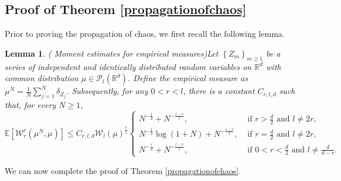 \documentclass[12pt]{article}
\numberwithin{equation}{section}
\newtheorem{lemma}[assumption]{Lemma}
\begin{document}
\subsection{Proof of Theorem \ref{propagationofchaos}}
 Prior to proving the propagation of chaos, we first recall the following lemma.
\begin{lemma}(\cite[Theorem 1]{Fournier2015empirical}  Moment estimates for empirical measures)\label{lem:Momentestimatesformeasure}
Let $\left\{Z_m\right\}_{m \geq 1}$ be a series of independent and identically distributed random variables on $\mathbb{R}^d$ with common distribution $\mu \in \mathcal{P}_{l}\left(\mathbb{R}^d\right)$. Define the empirical measure as $\mu^N=\tfrac{1}{N} \sum_{j=1}^N \delta_{Z_j}$. Subsequently, for any $0<r<l$, there is a constant $C_{r, l, d}$ such that, for every $N \geq 1$,
\begin{equation}\tag{5.1}\label{estimatesformeasure}
\mathbb{E}\left[\mathcal{W}^r_r\left(\mu^N, \mu\right)\right] \leq C_{r, l, d} \mathcal{W}_{l}\left( \mu \right)^{\frac{r}{l}} \begin{cases}N^{-\frac{1 }{2} }+N^{-\frac{l-r}{l}}, & \text { if } r>\frac{d}{2} \text { and } l \neq 2 r, \\ N^{-\frac{1 }{2}} \log \left(1+N\right)+N^{-\frac{l-r}{l}}, & \text { if } r=\frac{d}{2}  \text { and } l \neq 2 r, \\ N^{-\frac{r}{d}}+N^{-\frac{l-r}{l}}, & \text { if } 0<r<\frac{d}{2} \text { and } l \neq \frac{d}{d-r}.\end{cases}
\end{equation}
\end{lemma}
We can now complete the proof of Theorem \ref{propagationofchaos}.
\end{document}

